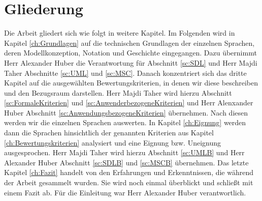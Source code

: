 \section{Gliederung}
\label{sc:Gliederung}
Die Arbeit gliedert sich wie folgt in weitere Kapitel. Im Folgenden wird in Kapitel \ref{ch:Grundlagen} auf die technischen Grundlagen der einzelnen Sprachen, deren Modellkonzeption, Notation und Geschichte eingegangen. Dazu übernimmt Herr Alexander Huber die Verantwortung für Abschnitt \ref{sc:SDL} und Herr Majdi Taher Abschnitte \ref{sc:UML} und \ref{sc:MSC}. Danach konzentriert sich das dritte Kapitel auf die ausgewählten Bewertungskriterien, in denen wir diese beschreiben und den Bezugsraum darstellen. Herr Majdi Taher wird hierzu Abschnitt \ref{sc:FormaleKriterien} und \ref{sc:AnwenderbezogeneKriterien} und Herr Alenxander Huber Abschnitt \ref{sc:AnwendungsbezogeneKriterien} übernehmen. Nach diesen werden wir die einzelnen Sprachen auswerten. In Kapitel \ref{ch:Eignung} werden dann die Sprachen hinsichtlich der genannten Kriterien aus Kapitel \ref{ch:Bewertungskriterien} analysiert und eine Eignung bzw. Uneignung ausgesprochen. Herr Majdi Taher wird hierzu Abschnitt \ref{sc:UMLB} und Herr Alexander Huber Abschnitt \ref{sc:SDLB} und \ref{sc:MSCB} übernehmen.
Das letzte Kapitel \ref{ch:Fazit} handelt von den Erfahrungen und Erkenntnissen, die während
der Arbeit gesammelt wurden. Sie wird noch einmal überblickt und schließt mit einem Fazit ab. Für die Einleitung war Herr Alexander Huber verantwortlich.
